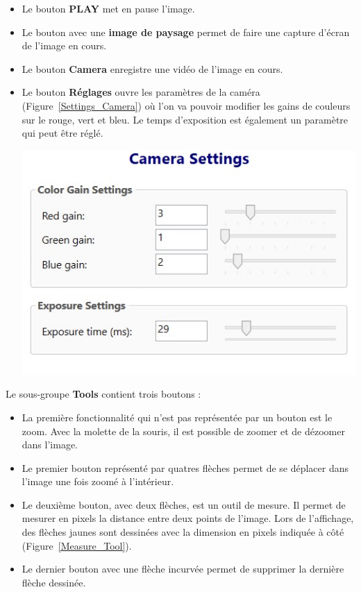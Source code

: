 \begin{itemize}[label=\textbullet]
    \item Le bouton \textbf{PLAY} met en pause l'image.
    \item Le bouton avec une \textbf{image de paysage} permet de faire une capture d'écran de l'image en cours.
    \item Le bouton \textbf{Camera} enregistre une vidéo de l'image en cours.
    \item
          \begin{minipage}{0.4\textwidth}
              Le bouton \textbf{Réglages} ouvre les paramètres de la caméra (Figure~\ref{Settings_Camera}) où l'on va pouvoir modifier les gains de couleurs sur le rouge, vert et bleu. Le temps d'exposition est également un paramètre qui peut être réglé.
          \end{minipage}
          \hfill
          \begin{minipage}{0.55\textwidth}
              \centering
              \includegraphics[width=\textwidth]{assets/figures/Application_ServoVision/Settings_Camera.png}
              \label{Settings_Camera}
          \end{minipage}
\end{itemize}
Le sous-groupe \textbf{Tools} contient trois boutons :
\begin{itemize}[label=\textbullet]
    \item La première fonctionnalité qui n'est pas représentée par un bouton est le zoom. Avec la molette de la souris, il est possible de zoomer et de dézoomer dans l'image.
    \item Le premier bouton représenté par quatres flèches permet de se déplacer dans l'image une fois zoomé à l'intérieur.
    \item Le deuxième bouton, avec deux flèches, est un outil de mesure. Il permet de mesurer en pixels la distance entre deux points de l'image. Lors de l'affichage, des flèches jaunes sont dessinées avec la dimension en pixels indiquée à côté (Figure~\ref{Measure_Tool}).
    \item Le dernier bouton avec une flèche incurvée permet de supprimer la dernière flèche dessinée.
\end{itemize}

